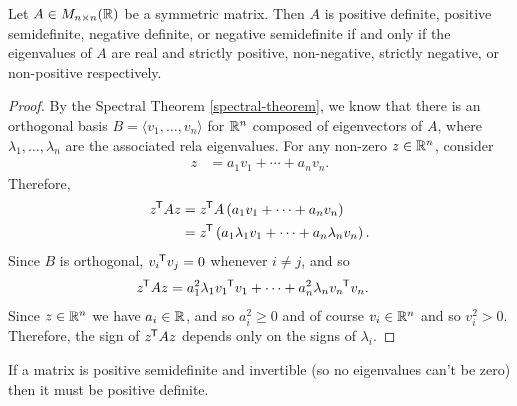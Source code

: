 \begin{thm}\label{positive-semidefinite-criteria}
    Let $A \in M_{n \times n}(\mathbb{R})$ be a symmetric matrix. Then $A$ is positive definite, positive semidefinite, negative definite, or negative semidefinite if and only if the eigenvalues of $A$ are real and strictly positive, non-negative, strictly negative, or non-positive respectively.
\end{thm}

\begin{proof}
    By the Spectral Theorem \ref{spectral-theorem}, we know that there is an orthogonal basis $B = \langle v_1, \ldots, v_n\rangle$ for $\mathbb{R}^n$ composed of eigenvectors of $A$, where $\lambda_1, \ldots, \lambda_n$ are the associated rela eigenvalues. For any non-zero $z \in \mathbb{R}^n$, consider
    \begin{align*}
        z &= a_1v_1 + \cdots + a_nv_n.
    \end{align*}
    Therefore,
    \begin{align*}
        {z}^{\mkern-1.5mu\mathsf{T}}Az &= {z}^{\mkern-1.5mu\mathsf{T}}A\left(a_1v_1 + \cdots + a_nv_n\right) \\
        &= {z}^{\mkern-1.5mu\mathsf{T}}\left(a_1\lambda_1v_1 + \cdots + a_n\lambda_{n}v_n\right).
    \end{align*}
    Since $B$ is orthogonal, ${v_i}^{\mkern-1.5mu\mathsf{T}}v_j = 0$ whenever $i \neq j$, and so
    \begin{align*}
        {z}^{\mkern-1.5mu\mathsf{T}}Az &= a_1^2\lambda_1{v_1}^{\mkern-1.5mu\mathsf{T}}v_1 + \cdots + a_n^2\lambda_{n}{v_n}^{\mkern-1.5mu\mathsf{T}}v_n.
    \end{align*}
    Since $z \in \mathbb{R}^n$ we have $a_i \in \mathbb{R}$, and so $a_i^2 \geq 0$ and of course $v_i \in \mathbb{R}^n$ and so $v_i^2 > 0$. Therefore, the sign of ${z}^{\mkern-1.5mu\mathsf{T}}Az$ depends only on the signs of $\lambda_i$.
\end{proof}

\begin{cor}
    If a matrix is positive semidefinite and invertible (so no eigenvalues can't be zero) then it must be positive definite.
\end{cor}
